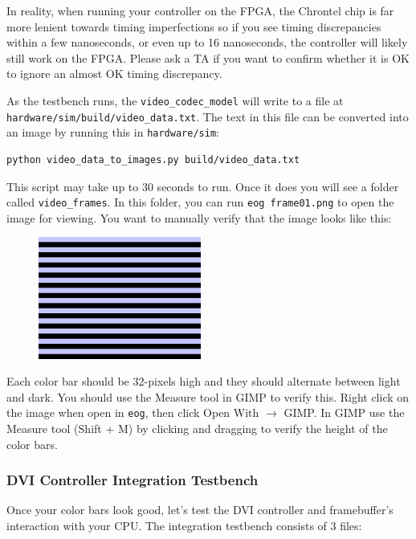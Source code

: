 \documentclass[11pt]{article}
\begin{document}
In reality, when running your controller on the FPGA, the Chrontel chip is far more lenient towards timing imperfections so if you see timing discrepancies within a few nanoseconds, or even up to 16 nanoseconds, the controller will likely still work on the FPGA. Please ask a TA if you want to confirm whether it is OK to ignore an almost OK timing discrepancy.

As the testbench runs, the \verb|video_codec_model| will write to a file at \verb|hardware/sim/build/video_data.txt|. The text in this file can be converted into an image by running this in \verb|hardware/sim|:

\begin{verbatim}
python video_data_to_images.py build/video_data.txt
\end{verbatim}

This script may take up to 30 seconds to run. Once it does you will see a folder called \verb|video_frames|. In this folder, you can run \verb|eog frame01.png| to open the image for viewing. You want to manually verify that the image looks like this:

\begin{figure}[H]
	\centerline{\includegraphics[height=4cm]{dvi_controller_testbench_output.png}}
\end{figure}

Each color bar should be 32-pixels high and they should alternate between light and dark. You should use the Measure tool in GIMP to verify this. Right click on the image when open in \verb|eog|, then click Open With $\rightarrow$ GIMP. In GIMP use the Measure tool (Shift + M) by clicking and dragging to verify the height of the color bars.

\subsubsection{DVI Controller Integration Testbench}
Once your color bars look good, let's test the DVI controller and framebuffer's interaction with your CPU. The integration testbench consists of 3 files:
\end{document}
